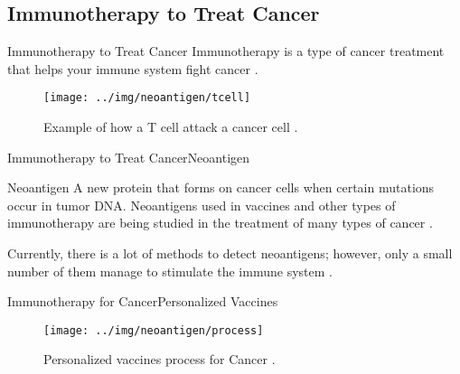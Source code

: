 \documentclass[10pt, aspectratio=169]{beamer}
\newcommand{\1}{
	\setbeamertemplate{background}{
		\texttt{[image: img/1]}
		\tikz[overlay] \fill[fill opacity=0.75,fill=white] (0,0) rectangle (-\paperwidth,\paperheight);
	}
}
\begin{document}
	\subsection{Immunotherapy to Treat Cancer}
	
	\begin{frame}{Immunotherapy to Treat Cancer}{}		
		Immunotherapy is a type of cancer treatment that helps your immune system fight cancer \cite{inmunoterapy2022}.
		
		\begin{figure}
			\texttt{[image: ../img/neoantigen/tcell]}
			\caption{Example of how a T cell attack a cancer cell \cite{nortshore2022}.}
		\end{figure}		
	\end{frame}
	
	\begin{frame}{Immunotherapy to Treat Cancer}{Neoantigen}		
		\begin{block}{Neoantigen}
			A new protein that forms on cancer cells when certain mutations occur in tumor DNA. Neoantigens used in vaccines and other types of immunotherapy are being studied in the treatment of many types of cancer \cite{NCIdictionary2022, borden2022cancer}.
		\end{block} 
		\begin{block}{}
			Currently, there is a lot of methods to detect neoantigens; however, only a small number of them manage to stimulate the immune system \cite{chen2021challenges, hao2021improvement}.
		\end{block}
	\end{frame}
	
	
	\begin{frame}{Immunotherapy for Cancer}{Personalized Vaccines}	
		\begin{figure}
			\texttt{[image: ../img/neoantigen/process]}
			\caption{Personalized vaccines process for Cancer \cite{peng2019neoantigen}.}
		\end{figure}		
	\end{frame}
	
\end{document}
